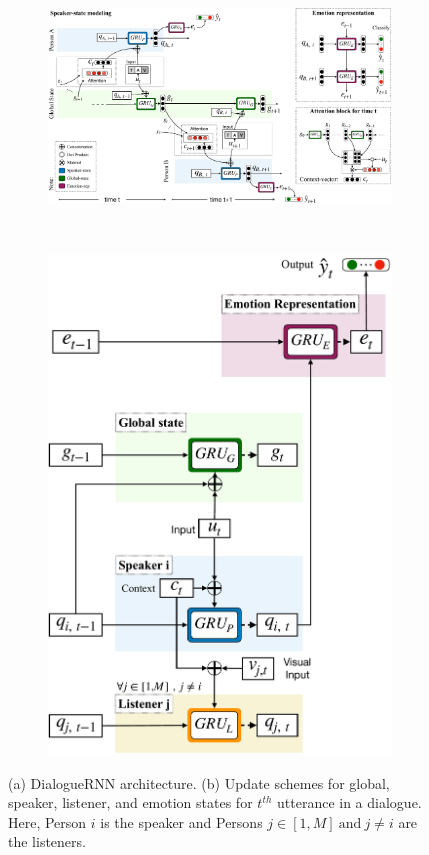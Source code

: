 \documentclass[letterpaper]{article} %
\begin{document}
\begin{figure}[ht]
  \centering
  \begin{subfigure}{0.73\textwidth}
  \centering
  \includegraphics[width=\linewidth]{DialogueRNN.pdf}
  \caption{}
  \label{fig:architecture}
  \end{subfigure}
  ~
	\begin{subfigure}{0.25\textwidth}
	\centering
  \small
	\includegraphics[width=\linewidth]{StateUpdate}
	\caption{}
	\label{fig:StateUpdate}
	\end{subfigure}
\caption{(a) DialogueRNN architecture. (b) Update schemes for global, speaker, listener, and emotion states for $t^{th}$ utterance in a
	dialogue. Here, Person $i$ is the speaker and Persons $j \in [1, M] \ \text{and} \ j \neq i $ are the
	listeners.}
\end{figure}
\end{document}
